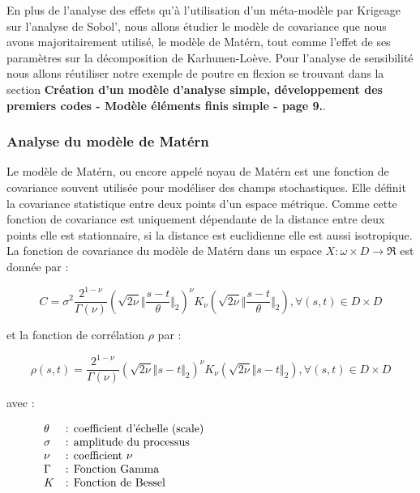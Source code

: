 \documentclass[a4paper,10pt]{article}
\begin{document}
	En plus de l'analyse des effets qu'à l'utilisation d'un méta-modèle par Krigeage sur l'analyse de Sobol', nous allons étudier le modèle de covariance que nous avons majoritairement utilisé, le modèle de Matérn, tout comme l'effet de ses paramètres sur la décomposition de Karhunen-Loève. Pour l'analyse de sensibilité nous allons réutiliser notre exemple de poutre en flexion se trouvant dans la section \textbf{Création d'un modèle d'analyse simple, développement des premiers codes - Modèle éléments finis simple - page 9.}. 
	
	\subsubsection{Analyse du modèle de Matérn}
	 
	Le modèle de Matérn, ou encore appelé noyau de Matérn est une fonction de covariance souvent utilisée pour modéliser des champs stochastiques. Elle définit la covariance statistique entre deux points d'un espace métrique. Comme cette fonction de covariance est uniquement dépendante de la distance entre deux points elle est stationnaire, si la distance est euclidienne elle est aussi isotropique. \\
	
	La fonction de covariance du modèle de Matérn dans un espace $X : \omega \times D \rightarrow \Re $ est donnée par : 
	
	\begin{equation}
	C = \sigma^{2}\frac{2^{1-\nu}}{\Gamma(\nu)}\left(\sqrt{2\nu}\Vert\frac{s-t}{\theta}\Vert_{2}\right)^{\nu} K_{\nu} \left(\sqrt{2\nu}\Vert\frac{s-t}{\theta}\Vert_{2}\right) , \forall(s,t) \in D \times D
	\end{equation}
	
	et la fonction de corrélation $ \rho $ par : 
	
	\begin{equation}
	\rho(s,t) = \frac{2^{1-\nu}}{\Gamma(\nu)}\left(\sqrt{2\nu}\Vert s-t \Vert_{2}\right)^{\nu} K_{\nu} \left(\sqrt{2\nu}\Vert s-t \Vert_{2}\right) , \forall(s,t) \in D \times D
	\end{equation}

	avec :
	
   \[
      \begin{array}{lp{0.8\linewidth}}	
	    \theta & : coefficient d'échelle (scale) \\
	    \sigma & : amplitude du processus \\
		\nu    & : coefficient $\nu$ 	\\
		\Gamma & : Fonction Gamma \\
		K      & : Fonction de Bessel
      \end{array}
   \]	
\end{document}

